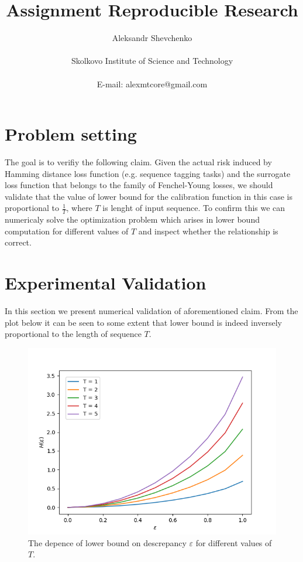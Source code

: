 \documentclass[11pt]{article}
\title{Assignment Reproducible Research}
\author
{Aleksandr Shevchenko\\
\\
\normalsize{Skolkovo Institute of Science and Technology}\\
\\
\normalsize{E-mail:  alexmtcore@gmail.com}
}
\date{}
\begin{document}
 

\maketitle 

\newpage

\section{Problem setting}

The goal is to verifiy the following claim. Given the actual risk induced by Hamming distance loss function (e.g. sequence tagging tasks) and the surrogate loss function that
belongs to the family of Fenchel-Young losses, we should validate that the value of lower bound for the calibration function in this case is proportional to
$\frac{1}{T}$, where $T$ is lenght of input sequence. To confirm this we can numericaly solve the optimization problem which arises in lower bound computation for different values
of $T$ and inspect whether the relationship is correct.


\section{Experimental Validation}

In this section we present numerical validation of aforementioned claim. From the plot below it can be seen to some extent that lower bound is indeed inversely proportional to the length of
sequence $T$.

\begin{figure}[ht]
    \centering
    \includegraphics[width=\textwidth]{figs/comparison}
    \caption{The depence of lower bound on descrepancy $\varepsilon$ for different values of $T$.}
\end{figure}
\end{document}
